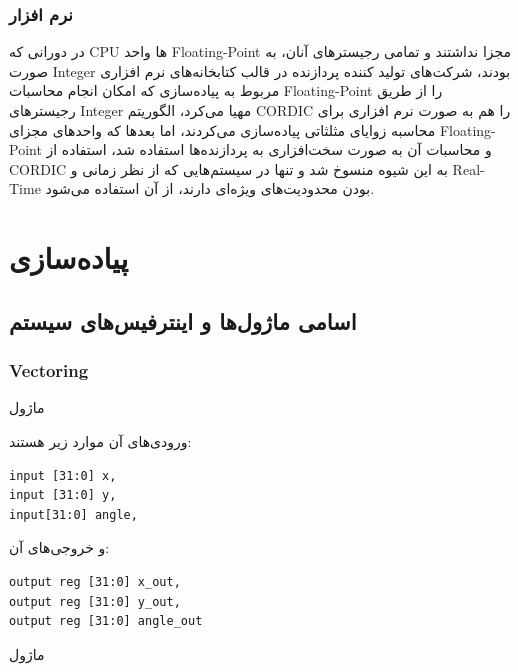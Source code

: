 \documentclass[12pt,titlepage,a4page , tikz , multi,table , svgnames,xcdraw]{article}
\begin{document}
\subsubsection{نرم افزار}

در دورانی که CPU ها واحد Floating-Point مجزا نداشتند و تمامی رجیسترهای آنان، به صورت Integer بودند، شرکت‌های تولید کننده پردازنده در قالب کتابخانه‌های نرم افزاری مربوط به پیاده‌سازی  که امکان انجام محاسبات Floating-Point را از طریق رجیسترهای Integer مهیا می‌کرد، الگوریتم CORDIC را هم به صورت نرم افزاری برای محاسبه زوایای مثلثاتی پیاده‌سازی می‌کردند، اما بعدها که واحدهای مجزای Floating-Point و محاسبات آن به صورت سخت‌افزاری به پردازنده‌ها استفاده شد، استفاده از CORDIC به این شیوه منسوخ شد و تنها در سیستم‌هایی که از نظر زمانی و Real-Time بودن محدودیت‌های ویژه‌ای دارند، از آن استفاده می‌شود. \cite{wikipedia}


\newpage


\section{پیاده‌سازی}
\subsection{اسامی ماژول‌ها و اینترفیس‌های سیستم}

\subsubsection{Vectoring}


 
 ماژول  

 ورودی‌های آن موارد زیر هستند:

\begin{latin}
\begin{verbatim}
input [31:0] x,
input [31:0] y,
input[31:0] angle,
\end{verbatim}
\end{latin}

و خروجی‌های آن:

\begin{latin}
\begin{verbatim}
output reg [31:0] x_out,
output reg [31:0] y_out,
output reg [31:0] angle_out
\end{verbatim}
\end{latin}

\hrulefill


ماژول   
 
\end{document}
